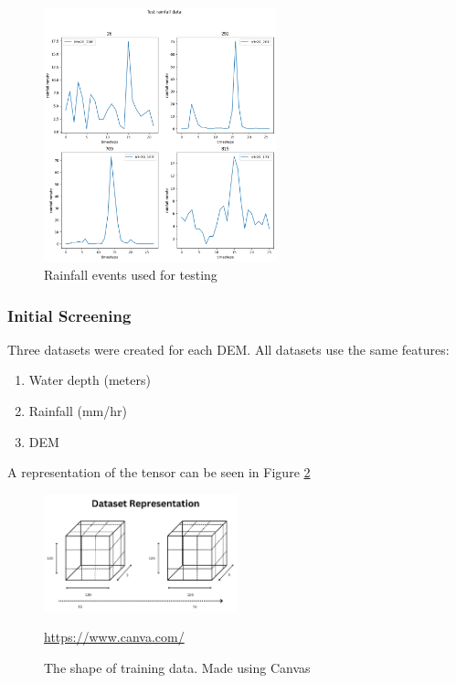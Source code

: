 \begin{figure}[htbp]
	\includegraphics[width=0.6\textwidth]{../Figures/test_rainfall_events.png}
	\centering
	\caption[Rainfall Test]{Rainfall events used for testing} 
	\label{fig:4.4}
\end{figure}

\subsubsection*{Initial Screening}
Three datasets were created for each DEM. All datasets use the same features:
\begin{enumerate}
	\item Water depth (meters)
	\item Rainfall (mm/hr)
	\item DEM
\end{enumerate}

A representation of the tensor can be seen in Figure \ref{fig:4.5} \\

\begin{figure}[htbp]
	\includegraphics[width=0.5\textwidth]{../Figures/dataset_visualization}
	\centering
	\caption[training data]{The shape of training data. Made using Canvas}
	\url{https://www.canva.com/}
	\label{fig:4.5}
\end{figure}

